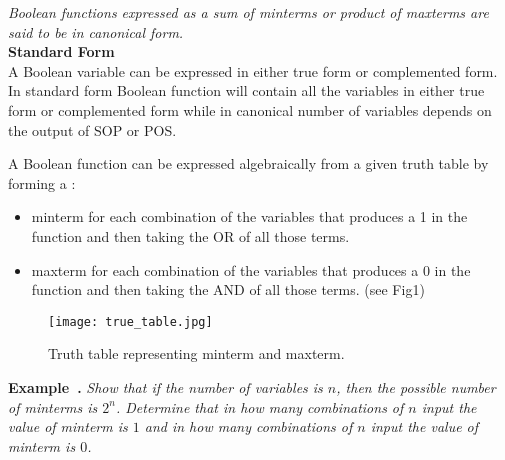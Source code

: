 \documentclass{article}
\newcounter{example}
\newenvironment{example}[1][]{\refstepcounter{example}\par\medskip
\noindent\textbf{Example~\theexample. #1} \rmfamily}{\medskip}
\begin{document}
\textit{Boolean functions expressed as a sum of minterms or product of maxterms are said to be in canonical form.}
\\\textbf{Standard Form} \\A Boolean variable can be expressed in either true form or complemented form. In standard form Boolean function will contain all the variables in either true form or complemented form while in canonical number of variables depends on the output of SOP or POS. 

A Boolean function can be expressed algebraically from a given truth table by forming a : 
\begin{itemize}
\item minterm for each combination of the variables that produces a 1 in the function and then taking the OR of all those terms.
\item maxterm for each combination of the variables that produces a 0 in the function and then taking the AND of all those terms. (see Fig1)
\end{itemize}



\begin{figure}
\centering
\texttt{[image: true\_table.jpg]}
\caption{\label{fig:true table}Truth table representing minterm and maxterm.}
\end{figure}

\begin{example}
    \textit{Show that if the number of variables is $n$, then the possible number of minterms is $2^n$.
    Determine that in how many combinations of $n$ input the value of minterm is $1$ and in how many combinations of $n$ input the value of minterm is $0$.}
\end{example}
\newpage
\end{document}

